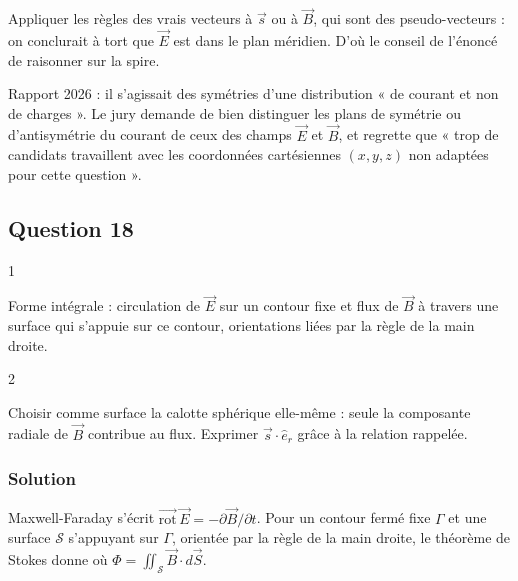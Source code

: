 \documentclass[11pt,a4paper]{article}
\newcommand{\equationajustee}[1]{%
  \sbox{\boiteequation}{$\displaystyle #1$}%
  \ifdim\wd\boiteequation>\linewidth
    \[\resizebox{\linewidth}{!}{\usebox{\boiteequation}}\]%
  \else
    \[#1\]%
  \fi}
\begin{document}
\begin{piege}

Appliquer les règles des vrais vecteurs à \(\vec s\) ou à \(\vec B\), qui sont des pseudo-vecteurs : on conclurait à tort que \(\vec E\) est dans le plan méridien. D'où le conseil de l'énoncé de raisonner sur la spire.

\end{piege}

\begin{jury}

Rapport 2026 : il s'agissait des symétries d'une distribution « de courant et non de charges ». Le jury demande de bien distinguer les plans de symétrie ou d'antisymétrie du courant de ceux des champs \(\vec E\) et \(\vec B\), et regrette que « trop de candidats travaillent avec les coordonnées cartésiennes \((x, y, z)\) non adaptées pour cette question ».

\end{jury}

\hypertarget{question-18}{%
\subsection{Question 18}\label{question-18}}

\begin{indication}{1}

Forme intégrale : circulation de \(\vec E\) sur un contour fixe et flux de \(\vec B\) à travers une surface qui s'appuie sur ce contour, orientations liées par la règle de la main droite.

\end{indication}

\begin{indication}{2}

Choisir comme surface la calotte sphérique elle-même : seule la composante radiale de \(\vec B\) contribue au flux. Exprimer \(\vec s\cdot\hat e_r\) grâce à la relation rappelée.

\end{indication}

\hypertarget{solution-17}{%
\subsubsection{Solution}\label{solution-17}}

Maxwell-Faraday s'écrit \(\overrightarrow{\mathrm{rot}}\,\vec E=-\partial\vec B/\partial t\). Pour un contour fermé fixe \(\Gamma\) et une surface \(\mathscr S\) s'appuyant sur \(\Gamma\), orientée par la règle de la main droite, le théorème de Stokes donne
\equationajustee{\boxed{\oint_\Gamma\vec E\cdot d\vec\ell=-\frac{d\Phi}{dt}}}
où \(\Phi=\iint_{\mathscr S}\vec B\cdot d\vec S\).
\end{document}
